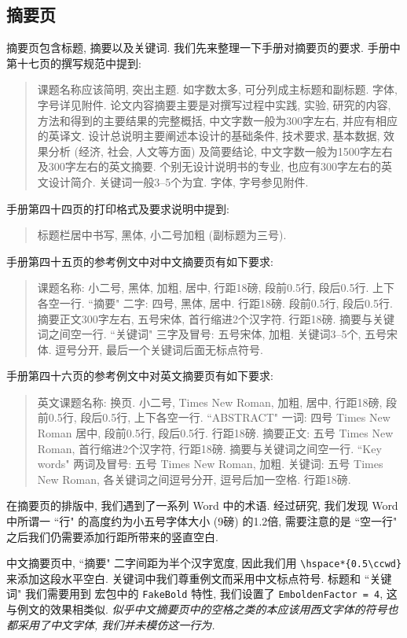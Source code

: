 \subsection{摘要页}

摘要页包含标题, 摘要以及关键词. 我们先来整理一下手册对摘要页的要求. 手册中第十七页的撰写规范中提到:
\begin{quote}
  课题名称应该简明, 突出主题. 如字数太多, 可分列成主标题和副标题. 字体, 字号详见附件.
  论文内容摘要主要是对撰写过程中实践, 实验, 研究的内容, 方法和得到的主要结果的完整概括, 中文字数一般为300字左右, 并应有相应的英译文.
  设计总说明主要阐述本设计的基础条件, 技术要求, 基本数据, 效果分析 (经济, 社会, 人文等方面) 及简要结论, 中文字数一般为1500字左右及300字左右的英文摘要. 个别无设计说明书的专业, 也应有300字左右的英文设计简介.
  关键词一般3--5个为宜. 字体, 字号参见附件.
\end{quote}
手册第四十四页的打印格式及要求说明中提到:
\begin{quote}
  标题栏居中书写, 黑体, 小二号加粗 (副标题为三号).
\end{quote}
手册第四十五页的参考例文中对中文摘要页有如下要求:
\begin{quote}
  课题名称: 小二号, 黑体, 加粗, 居中, 行距18磅, 段前0.5行, 段后0.5行. 上下各空一行.
  ``摘要" 二字: 四号, 黑体, 居中. 行距18磅. 段前0.5行, 段后0.5行.
  摘要正文300字左右, 五号宋体, 首行缩进2个汉字符. 行距18磅.
  摘要与关键词之间空一行.
  ``关键词" 三字及冒号: 五号宋体, 加粗.
  关键词3--5个, 五号宋体. 逗号分开, 最后一个关键词后面无标点符号.
\end{quote}
手册第四十六页的参考例文中对英文摘要页有如下要求:
\begin{quote}
  英文课题名称: 换页. 小二号, Times New Roman, 加粗, 居中, 行距18磅, 段前0.5行, 段后0.5行, 上下各空一行.
  ``ABSTRACT" 一词: 四号 Times New Roman 居中, 段前0.5行, 段后0.5行. 行距18磅.
  摘要正文: 五号 Times New Roman, 首行缩进2个汉字符, 行距18磅.
  摘要与关键词之间空一行.
  ``Key words" 两词及冒号: 五号 Times New Roman, 加粗.
  关键词: 五号 Times New Roman, 各关键词之间逗号分开, 逗号后加一空格. 行距18磅.
\end{quote}

在摘要页的排版中, 我们遇到了一系列 Word 中的术语. 经过研究, 我们发现 Word 中所谓一 ``行" 的高度约为小五号字体大小 (9磅) 的1.2倍, 需要注意的是 ``空一行" 之后我们仍需要添加行距所带来的竖直空白.

中文摘要页中, ``摘要" 二字间距为半个汉字宽度, 因此我们用 \verb|\hspace*{0.5\ccwd}| 来添加这段水平空白. 关键词中我们尊重例文而采用中文标点符号. 标题和 ``关键词" 我们需要用到  宏包中的 \verb|FakeBold| 特性, 我们设置了 \verb|EmboldenFactor = 4|, 这与例文的效果相类似. \emph{似乎中文摘要页中的空格之类的本应该用西文字体的符号也都采用了中文字体, 我们并未模仿这一行为.}


